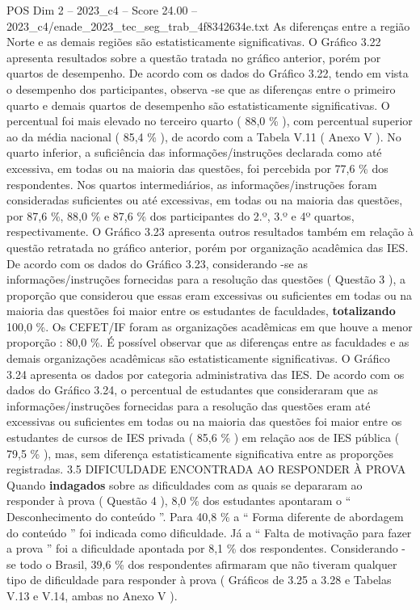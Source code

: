 \begin{textsample}{POS Dim 2 – 2023\_c4 – Score 24.00 – 2023\_c4/enade\_2023\_tec\_seg\_trab\_4f8342634e.txt}
As diferenças entre a região Norte e as demais regiões são estatisticamente significativas.
O Gráfico 3.22 apresenta resultados sobre a questão tratada no gráfico anterior, porém por quartos de desempenho.
De acordo com os dados do Gráfico 3.22, tendo em vista o desempenho dos participantes, observa -se que as diferenças entre o primeiro quarto e demais quartos de desempenho são estatisticamente significativas.
O percentual foi mais elevado no terceiro quarto ( 88,0 \% ), com percentual superior ao da média nacional ( 85,4 \% ), de acordo com a Tabela V.11 ( Anexo V ).
No quarto inferior, a suficiência das informações/instruções declarada como até excessiva, em todas ou na maioria das questões, foi percebida por 77,6 \% dos respondentes.
Nos quartos intermediários, as informações/instruções foram consideradas suficientes ou até excessivas, em todas ou na maioria das questões, por 87,6 \%, 88,0 \% e 87,6 \% dos participantes do 2.º, 3.º e 4º quartos, respectivamente.
O Gráfico 3.23 apresenta outros resultados também em relação à questão retratada no gráfico anterior, porém por organização acadêmica das IES.
De acordo com os dados do Gráfico 3.23, considerando -se as informações/instruções fornecidas para a resolução das questões ( Questão 3 ), a proporção que considerou que essas eram excessivas ou suficientes em todas ou na maioria das questões foi maior entre os estudantes de faculdades, \textbf{totalizando} 100,0 \%.
Os CEFET/IF foram as organizações acadêmicas em que houve a menor proporção : 80,0 \%.
É possível observar que as diferenças entre as faculdades e as demais organizações acadêmicas são estatisticamente significativas.
O Gráfico 3.24 apresenta os dados por categoria administrativa das IES.
De acordo com os dados do Gráfico 3.24, o percentual de estudantes que consideraram que as informações/instruções fornecidas para a resolução das questões eram até excessivas ou suficientes em todas ou na maioria das questões foi maior entre os estudantes de cursos de IES privada ( 85,6 \% ) em relação aos de IES pública ( 79,5 \% ), mas, sem diferença estatisticamente significativa entre as proporções registradas. 3.5 DIFICULDADE ENCONTRADA AO RESPONDER À PROVA Quando \textbf{indagados} sobre as dificuldades com as quais se depararam ao responder à prova ( Questão 4 ), 8,0 \% dos estudantes apontaram o “ Desconhecimento do conteúdo ”.
Para 40,8 \% a “ Forma diferente de abordagem do conteúdo ” foi indicada como dificuldade.
Já a “ Falta de motivação para fazer a prova ” foi a dificuldade apontada por 8,1 \% dos respondentes.
Considerando -se todo o Brasil, 39,6 \% dos respondentes afirmaram que não tiveram qualquer tipo de dificuldade para responder à prova ( Gráficos de 3.25 a 3.28 e Tabelas V.13 e V.14, ambas no Anexo V ).

\end{textsample}
